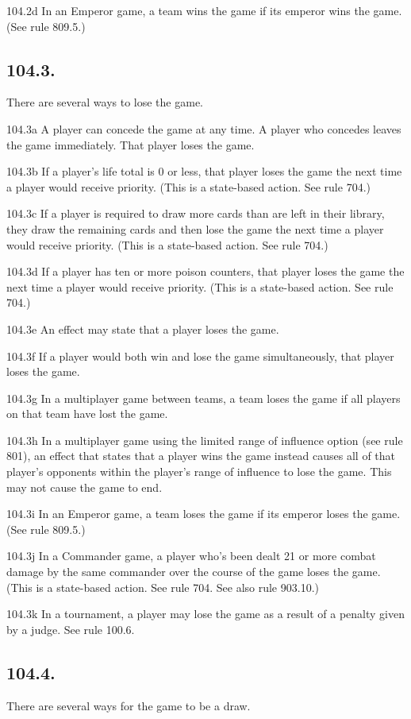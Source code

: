 104.2d In an Emperor game, a team wins the game if its emperor wins the game. (See rule 809.5.)

\subsection*{104.3.}
There are several ways to lose the game.

104.3a A player can concede the game at any time. A player who concedes leaves the game immediately. That player loses the game.

104.3b If a player’s life total is 0 or less, that player loses the game the next time a player would receive priority. (This is a state-based action. See rule 704.)

104.3c If a player is required to draw more cards than are left in their library, they draw the remaining cards and then lose the game the next time a player would receive priority. (This is a state-based action. See rule 704.)

104.3d If a player has ten or more poison counters, that player loses the game the next time a player would receive priority. (This is a state-based action. See rule 704.)

104.3e An effect may state that a player loses the game.

104.3f If a player would both win and lose the game simultaneously, that player loses the game.

104.3g In a multiplayer game between teams, a team loses the game if all players on that team have lost the game.

104.3h In a multiplayer game using the limited range of influence option (see rule 801), an effect that states that a player wins the game instead causes all of that player’s opponents within the player’s range of influence to lose the game. This may not cause the game to end.

104.3i In an Emperor game, a team loses the game if its emperor loses the game. (See rule 809.5.)

104.3j In a Commander game, a player who’s been dealt 21 or more combat damage by the same commander over the course of the game loses the game. (This is a state-based action. See rule 704. See also rule 903.10.)

104.3k In a tournament, a player may lose the game as a result of a penalty given by a judge. See rule 100.6.

\subsection*{104.4.}
There are several ways for the game to be a draw.

